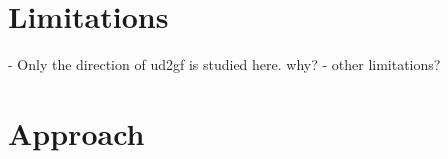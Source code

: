 \documentclass{article}
\begin{document}




\section{Limitations}

- Only the direction of ud2gf is studied here. why?
- other limitations?


\section{Approach}






\end{document}

